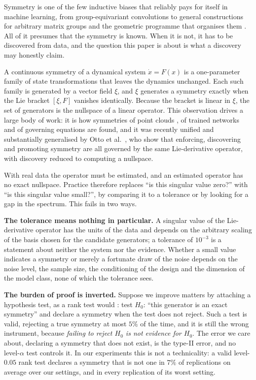Symmetry is one of the few inductive biases that reliably pays for itself in
machine learning, from group-equivariant convolutions
\citep{cohen2016group} to general constructions for
arbitrary matrix groups \citep{finzi2021practical} and the geometric programme
that organises them \citep{bronstein2021geometric}. All of it presumes that
the symmetry is known. When it is not, it has to be discovered from data, and
the question this paper is about is what a discovery may honestly claim.

A continuous symmetry of a dynamical system $\dot x = F(x)$ is a one-parameter
family of state transformations that leaves the dynamics unchanged. Each such
family is generated by a vector field $\xi$, and $\xi$ generates a symmetry
exactly when the Lie bracket $[\xi,F]$ vanishes identically. Because the
bracket is linear in $\xi$, the set of generators is the nullspace of a linear
operator. This observation drives a large body of work: it is how symmetries
of point clouds \citep{cahill2023liepca}, of trained networks
\citep{moskalev2022liegg,gruver2023lie} and of governing equations
\citep{kaiser2018discovering} are found, and it was recently unified and
substantially generalised by Otto et al.~\citep{otto2025unified}, who show that enforcing,
discovering and promoting symmetry are all governed by the same Lie-derivative
operator, with discovery reduced to computing a nullspace.

With real data the operator must be estimated, and an estimated operator has
no exact nullspace. Practice therefore replaces ``is this singular value
zero?'' with ``is this singular value small?'', by comparing it to a tolerance
or by looking for a gap in the spectrum. This fails in two ways.

\textbf{The tolerance means nothing in particular.} A singular value of the
Lie-derivative operator has the units of the data and depends on the arbitrary
scaling of the basis chosen for the candidate generators; a tolerance of
$10^{-3}$ is a statement about neither the system nor the evidence. Whether a
small value indicates a symmetry or merely a fortunate draw of the noise
depends on the noise level, the sample size, the conditioning of the design
and the dimension of the model class, none of which the tolerance sees.

\textbf{The burden of proof is inverted.} Suppose we improve matters by
attaching a hypothesis test, as a rank test would \citep{robin2000tests,
kleibergen2006generalized}: test $H_0$: ``this generator is an exact
symmetry'' and declare a symmetry when the test does not reject. Such a test
is valid, rejecting a true symmetry at most $5\%$ of the time, and it is still
the wrong instrument, because \emph{failing to reject $H_0$ is not evidence
for $H_0$}. The error we care about, declaring a symmetry that does not exist,
is the type-II error, and no level-$\alpha$ test controls it. In our
experiments this is not a technicality: a valid level-$0.05$ rank test
declares a symmetry that is not one in $7\%$ of replications on average over
our settings, and in every replication of its worst setting.

